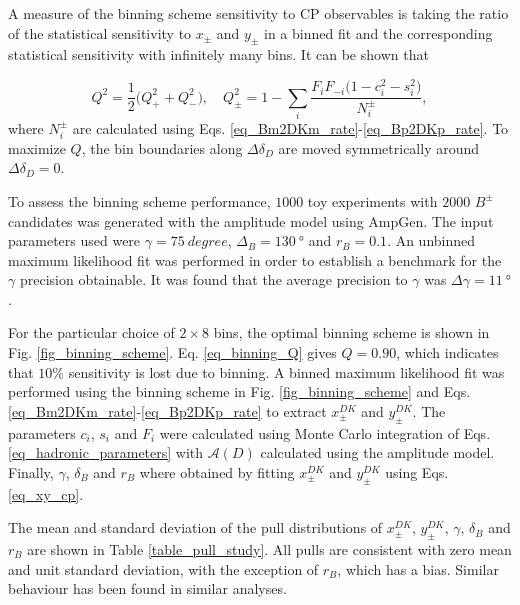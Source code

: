 \documentclass[12pt, a4paper, notitlepage, onecolumn]{article}
\numberwithin{equation}{section}
\begin{document}
A measure of the binning scheme sensitivity to CP observables is taking the ratio of the statistical sensitivity to $x_\pm$ and $y_\pm$ in a binned fit and the corresponding statistical sensitivity with infinitely many bins. It can be shown that

\begin{equation}
  Q^2 = \frac{1}{2}\big(Q^2_+ + Q^2_-\big), \quad Q^2_\pm = 1 - \sum_i\frac{F_iF_{-i}\big(1 - c_i^2 - s_i^2\big)}{N_i^\pm},
  \label{eq_binning_Q}
\end{equation}
where $N_i^\pm$ are calculated using Eqs. \eqref{eq_Bm2DKm_rate}-\eqref{eq_Bp2DKp_rate}. To maximize $Q$, the bin boundaries along $\Delta\delta_D$ are moved symmetrically around $\Delta\delta_D = 0$.

To assess the binning scheme performance, $1000$ toy experiments with $2000$ $B^\pm$ candidates was generated with the amplitude model using AmpGen. The input parameters used were $\gamma = \SI{75}{degree}$, $\Delta_B = \SI{130}{\degree}$ and $r_B = 0.1$. An unbinned maximum likelihood fit was performed in order to establish a benchmark for the $\gamma$ precision obtainable. It was found that the average precision to $\gamma$ was $\Delta\gamma = \SI{11}{\degree}$.

For the particular choice of $2\times 8$ bins, the optimal binning scheme is shown in Fig. \ref{fig_binning_scheme}. Eq. \eqref{eq_binning_Q} gives $Q = 0.90$, which indicates that $10\%$ sensitivity is lost due to binning. A binned maximum likelihood fit was performed using the binning scheme in Fig. \ref{fig_binning_scheme} and Eqs. \eqref{eq_Bm2DKm_rate}-\eqref{eq_Bp2DKp_rate} to extract $x_\pm^{DK}$ and $y_\pm^{DK}$. The parameters $c_i$, $s_i$ and $F_i$ were calculated using Monte Carlo integration of Eqs. \eqref{eq_hadronic_parameters} with $\mathcal{A}(D)$ calculated using the amplitude model. Finally, $\gamma$, $\delta_B$ and $r_B$ where obtained by fitting $x_\pm^{DK}$ and $y_\pm^{DK}$ using Eqs. \eqref{eq_xy_cp}.

The mean and standard deviation of the pull distributions of $x_\pm^{DK}$, $y_\pm^{DK}$, $\gamma$, $\delta_B$ and $r_B$ are shown in Table \ref{table_pull_study}. All pulls are consistent with zero mean and unit standard deviation, with the exception of $r_B$, which has a bias. Similar behaviour has been found in similar analyses.
\end{document}
